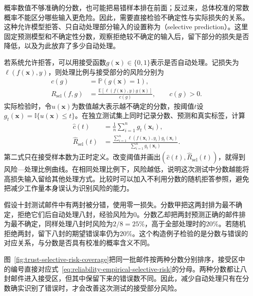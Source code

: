 概率数值不够准确的分数，也可能把易错样本排在前面；反过来，总体校准的常数概率不能区分哪些输入更危险。因此，需要直接检验不确定性与实际损失的关系。这种允许模型拒答、只自动处理部分输入的设置称为（selective prediction）。这里固定预测模型和不确定性分数，观察拒绝较不确定的输入后，留下部分的损失是否降低，以及为此放弃了多少自动处理。

若系统允许拒答，可以用接受函数$g(\bm{x})\in\{0,1\}$表示是否自动处理。记损失为$\ell(f(\bm{x}),y)$，则处理比例与接受部分的风险分别为
\begin{equation}
 \begin{aligned}
 c(g)&=\mathbb P(g(\bm{x})=1),\\
 R_{\mathrm{sel}}(f,g)
 &=\frac{\mathbb E[\ell(f(\bm{x}),y)g(\bm{x})]}
         {c(g)},\qquad c(g)>0.
 \end{aligned}
 \label{eq:reliability-selective-risk}
\end{equation}
实际检验时，令$u(\bm{x})$为数值越大表示越不确定的分数，按阈值$t$设$g_t(\bm{x})=\mathbb I\{u(\bm{x})\leq t\}$。在独立测试集上同时记录分数、预测和真实标签，计算
\begin{equation}
 \begin{aligned}
 \hat c(t)&=\frac1n\sum_{i=1}^{n}g_t(\bm{x}_i),\\
 \hat R_{\mathrm{sel}}(t)
 &=\frac{\sum_{i=1}^{n}\ell(f(\bm{x}_i),y_i)g_t(\bm{x}_i)}
          {\sum_{i=1}^{n}g_t(\bm{x}_i)}.
 \end{aligned}
 \label{eq:reliability-empirical-selective-risk}
\end{equation}
第二式只在接受样本数为正时定义。改变阈值并画出$(\hat c(t),\hat R_{\mathrm{sel}}(t))$，就得到风险—处理比例曲线。在相同处理比例下，风险越低，说明这次测试中分数越能将高损失输入留给其他处理方式。比较时可以加入不利用分数的随机拒答参照，避免把减少工作量本身误认为识别风险的能力。

\begin{example}[相同拒答比例下的不同效果]
\label{ex:reliability-risk-ranking}
假设十封测试邮件中有两封被分错，使用零一损失。分数甲把这两封排为最不确定，拒绝它们后自动处理八封，经验风险为0。分数乙却把两封预测正确的邮件排为最不确定，同样处理八封时风险为$2/8=25\%$，高于全部处理时的$20\%$。若随机拒绝两封，留下八封的期望错误率仍为$20\%$。这个构造例子检验的是分数与错误的对应关系，与分数是否具有校准的概率含义不同。
\end{example}

图~\ref{fig:trust-selective-risk-coverage}把同一批邮件按两种分数分别排序，接受区中的编号直接对应式~\eqref{eq:reliability-empirical-selective-risk}的分母。两种分数都让八封邮件进入接受区，但其中保留下来的错误数不同。因此，减少自动处理只有在分数确实识别了错误时，才会改善这次测试的接受部分风险。

